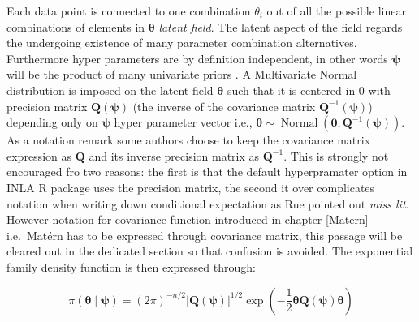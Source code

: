 \documentclass[
  12pt,
  a4paper,
  oneside]{book}
\theoremstyle{definition}
\theoremstyle{definition}
\theoremstyle{definition}
\theoremstyle{remark}
\begin{document}
Each data point is connected to one combination \(\theta_{i}\) out of all the possible linear combinations of elements in \(\boldsymbol{\theta}\) \emph{latent field}. The latent aspect of the field regards the undergoing existence of many parameter combination alternatives. Furthermore hyper parameters are by definition independent, in other words \(\boldsymbol{\psi}\) will be the product of many univariate priors \citep{Bayesian_INLA_Rubio}. A Multivariate Normal distribution is imposed on the latent field \(\boldsymbol{\theta}\) such that it is centered in 0 with precision matrix \(\boldsymbol{Q(\psi)}\) (the inverse of the covariance matrix \(\boldsymbol{Q}^{-1}(\boldsymbol{\psi})\)) depending only on \(\boldsymbol{\psi}\) hyper parameter vector i.e., \(\boldsymbol{\theta} \sim \operatorname{Normal}\left(\mathbf{0}, \boldsymbol{Q}^{-1}(\boldsymbol{\psi})\right)\). As a notation remark some authors choose to keep the covariance matrix expression as \(\boldsymbol{Q}\) and its inverse precision matrix as \(\boldsymbol{Q}^{-1}\). This is strongly not encouraged fro two reasons: the first is that the default hyperpramater option in INLA R package uses the precision matrix, the second it over complicates notation when writing down conditional expectation as Rue pointed out \emph{miss lit}. However notation for covariance function introduced in chapter \ref{Matern} i.e.~Matérn has to be expressed through covariance matrix, this passage will be cleared out in the dedicated section so that confusion is avoided.
The exponential family density function is then expressed through:

\begin{equation}
\pi(\boldsymbol{\theta} \mid \boldsymbol{\psi})=(2 \pi)^{-n / 2}| \boldsymbol{Q(\psi)}|^{1 / 2} \exp \left(-\frac{1}{2} \boldsymbol{\theta} \boldsymbol{Q(\psi)} \boldsymbol{\theta}\right)
\label{eq:gmrf}
\end{equation}
\end{document}
